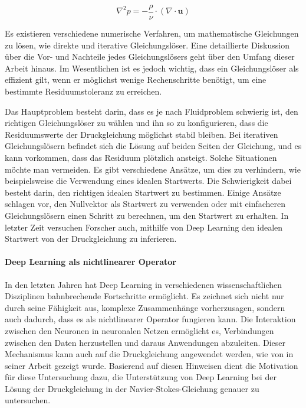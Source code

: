 \begin{equation}
\nabla^2 p = -\frac{\rho}{\nu} \cdot \left(\nabla \cdot \mathbf{u} \right)\label{eq:poisson_pressure}
\end{equation}

Es existieren verschiedene numerische Verfahren, um mathematische Gleichungen zu lösen, wie direkte und iterative Gleichungslöser. Eine detaillierte Diskussion über die Vor- und Nachteile jedes Gleichungslösers geht über den Umfang dieser Arbeit hinaus. Im Wesentlichen ist es jedoch wichtig, dass ein Gleichungslöser als effizient gilt, wenn er möglichst wenige Rechenschritte benötigt, um eine bestimmte Residuumstoleranz zu erreichen. \parencite{_a175b16f}

Das Hauptproblem besteht darin, dass es je nach Fluidproblem schwierig ist, den richtigen Gleichungslöser zu wählen und ihn so zu konfigurieren, dass die Residuumswerte der Druckgleichung möglichst stabil bleiben. Bei iterativen Gleichungslösern befindet sich die Lösung auf beiden Seiten der Gleichung, und es kann vorkommen, dass das Residuum plötzlich ansteigt. Solche Situationen möchte man vermeiden. Es gibt verschiedene Ansätze, um dies zu verhindern, wie beispielsweise die Verwendung eines idealen Startwerts. Die Schwierigkeit dabei besteht darin, den richtigen idealen Startwert zu bestimmen. Einige Ansätze schlagen vor, den Nullvektor als Startwert zu verwenden oder mit einfacheren Gleichungslösern einen Schritt zu berechnen, um den Startwert zu erhalten. In letzter Zeit versuchen Forscher auch, mithilfe von Deep Learning den idealen Startwert von der Druckgleichung zu inferieren. \parencite{zhen_zhang_9c968f8f}

\paragraph{Deep Learning als nichtlinearer Operator}
In den letzten Jahren hat Deep Learning in verschiedenen wissenschaftlichen Disziplinen bahnbrechende Fortschritte ermöglicht. Es zeichnet sich nicht nur durch seine Fähigkeit aus, komplexe Zusammenhänge vorherzusagen, sondern auch dadurch, dass es als nichtlinearer Operator fungieren kann. Die Interaktion zwischen den Neuronen in neuronalen Netzen ermöglicht es, Verbindungen zwischen den Daten herzustellen und daraus Anwendungen abzuleiten. Dieser Mechanismus kann auch auf die Druckgleichung angewendet werden, wie von \textcite{maziar_raissi_d5f7aacc} in seiner Arbeit gezeigt wurde. Basierend auf diesen Hinweisen dient die Motivation für diese Untersuchung dazu, die Unterstützung von Deep Learning bei der Lösung der Druckgleichung in der Navier-Stokes-Gleichung genauer zu untersuchen.

